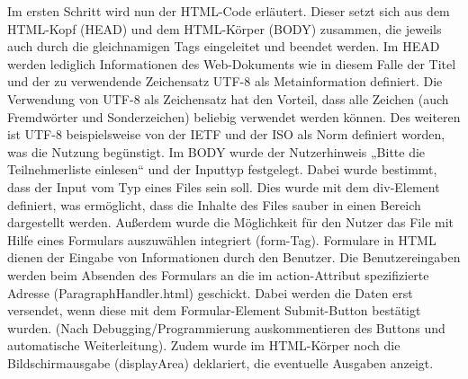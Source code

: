 {Im ersten Schritt wird nun der HTML-Code erläutert. Dieser setzt sich aus dem HTML-Kopf (HEAD) und dem HTML-Körper (BODY) zusammen, die jeweils auch durch die gleichnamigen Tags eingeleitet und beendet werden. Im HEAD werden lediglich Informationen des Web-Dokuments wie in diesem Falle der Titel und der zu verwendende Zeichensatz \ac{UTF-8} als Metainformation definiert. Die Verwendung von UTF-8 als Zeichensatz hat den Vorteil, dass alle Zeichen (auch Fremdwörter und Sonderzeichen) beliebig verwendet werden können. Des weiteren ist UTF-8 beispielsweise von der \ac{IETF} und der \ac{ISO} als Norm definiert worden, was die Nutzung begünstigt.  Im BODY wurde der Nutzerhinweis „Bitte die Teilnehmerliste einlesen“  und der Inputtyp festgelegt. Dabei wurde bestimmt, dass der Input vom Typ eines Files sein soll. Dies wurde mit dem div-Element definiert, was ermöglicht, dass die Inhalte des Files sauber in einen Bereich dargestellt werden. Außerdem wurde die Möglichkeit für den Nutzer das File mit Hilfe eines Formulars auszuwählen integriert (form-Tag). Formulare in HTML dienen der Eingabe von Informationen durch den Benutzer. Die Benutzereingaben werden beim Absenden des Formulars an die im action-Attribut spezifizierte Adresse (ParagraphHandler.html) geschickt. Dabei werden die Daten erst versendet, wenn diese mit dem Formular-Element Submit-Button bestätigt wurden. (Nach Debugging/Programmierung auskommentieren des Buttons und automatische Weiterleitung). Zudem wurde im HTML-Körper noch die Bildschirmausgabe (displayArea) deklariert, die eventuelle Ausgaben anzeigt. 

}
